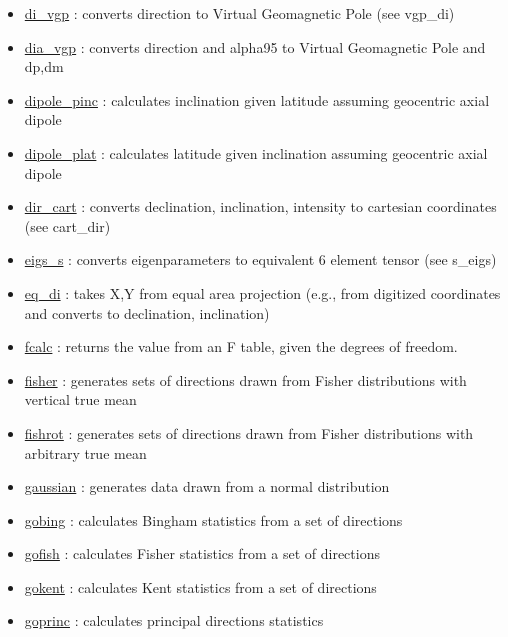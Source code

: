 \documentclass[11pt]{book}
\begin{document}
{{\begin{itemize}
\item \href{http://pmagpy.github.io/PmagPy.html#di_vgp}{di\_vgp} : converts direction to Virtual Geomagnetic Pole (see vgp\_di)
\item \href{http://pmagpy.github.io/PmagPy.html#dia_vgp}{dia\_vgp} : converts direction and alpha95 to Virtual Geomagnetic Pole and dp,dm
\item \href{http://pmagpy.github.io/PmagPy.html#dipole_pinc}{dipole\_pinc} : calculates inclination given latitude assuming geocentric axial dipole
\item \href{http://pmagpy.github.io/PmagPy.html#dipole_plat}{dipole\_plat} : calculates latitude given inclination assuming geocentric axial dipole
\item \href{http://pmagpy.github.io/PmagPy.html#dir_cart}{dir\_cart} : converts declination, inclination, intensity to cartesian coordinates (see cart\_dir)
\item \href{http://pmagpy.github.io/PmagPy.html#eigs_s}{eigs\_s} : converts eigenparameters to equivalent 6 element tensor (see s\_eigs)
\item \href{http://pmagpy.github.io/PmagPy.html#eq_di}{eq\_di} : takes X,Y from equal area projection (e.g., from digitized coordinates and  converts to declination, inclination)
\item \href{http://pmagpy.github.io/PmagPy.html#fcalc}{fcalc} : returns the value from an F table, given the degrees of freedom.
\item \href{http://pmagpy.github.io/PmagPy.html#fisher}{fisher} : generates sets of directions drawn from Fisher distributions with vertical true mean
\item \href{http://pmagpy.github.io/PmagPy.html#fishrot}{fishrot} : generates sets of directions drawn from Fisher distributions with arbitrary true mean
\item \href{http://pmagpy.github.io/PmagPy.html#gaussian}{gaussian} : generates data drawn from a normal distribution
\item \href{http://pmagpy.github.io/PmagPy.html#gobing}{gobing} : calculates Bingham statistics from a set of directions
\item \href{http://pmagpy.github.io/PmagPy.html#gofish}{gofish} : calculates Fisher statistics from a set of directions
\item \href{http://pmagpy.github.io/PmagPy.html#gokent}{gokent} : calculates Kent statistics from a set of directions
\item \href{http://pmagpy.github.io/PmagPy.html#goprinc}{goprinc} : calculates principal directions statistics

\end{itemize}}}
\end{document}
